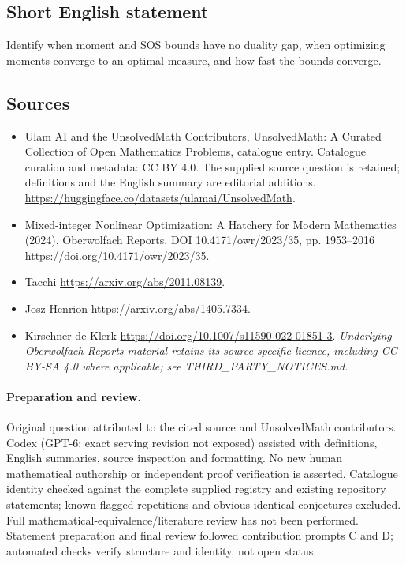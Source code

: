 \documentclass[11pt]{article}
\begin{document}
\subsection{Short English statement}
Identify when moment and SOS bounds have no duality gap, when optimizing moments converge to an optimal measure, and how fast the bounds converge.
\subsection{Sources}
\begin{itemize}
\item[\hypertarget{source:statement:1}{S1}] Ulam AI and the UnsolvedMath Contributors, UnsolvedMath: A Curated Collection of Open Mathematics Problems, catalogue entry. Catalogue curation and metadata: CC BY 4.0. The supplied source question is retained; definitions and the English summary are editorial additions.
\url{https://huggingface.co/datasets/ulamai/UnsolvedMath}.
\item[\hypertarget{source:statement:2}{S2}] Mixed-integer Nonlinear Optimization: A Hatchery for Modern Mathematics (2024), Oberwolfach Reports, DOI 10.4171/owr/2023/35, pp. 1953--2016
\url{https://doi.org/10.4171/owr/2023/35}.
\item[\hypertarget{source:statement:3}{S3}] Tacchi
\url{https://arxiv.org/abs/2011.08139}.
\item[\hypertarget{source:statement:4}{S4}] Josz-Henrion
\url{https://arxiv.org/abs/1405.7334}.
\item[\hypertarget{source:statement:5}{S5}] Kirschner-de Klerk
\url{https://doi.org/10.1007/s11590-022-01851-3}.
\textit{Underlying Oberwolfach Reports material retains its source-specific licence, including CC BY-SA 4.0 where applicable; see THIRD\_PARTY\_NOTICES.md.}
\end{itemize}
\paragraph{Preparation and review.}
Original question attributed to the cited source and UnsolvedMath contributors. Codex (GPT-6; exact serving revision not exposed) assisted with definitions, English summaries, source inspection and formatting. No new human mathematical authorship or independent proof verification is asserted. Catalogue identity checked against the complete supplied registry and existing repository statements; known flagged repetitions and obvious identical conjectures excluded. Full mathematical-equivalence/literature review has not been performed. Statement preparation and final review followed contribution prompts C and D; automated checks verify structure and identity, not open status.
\label{end:statement}
\end{document}
